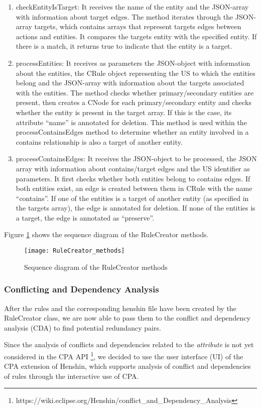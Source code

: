 \begin{enumerate}
	\item checkEntityIsTarget: It receives the name of the entity and the JSON-array with information about target edges. The method iterates through the JSON-array targets, which contains arrays that represent targets edges between actions and entities. It compares the targets entity with the specified entity. If there is a match, it returns true to indicate that the entity is a target.
	\item processEntities: It receives as parameters the JSON-object with information about the entities, the CRule object representing the US to which the entities belong and the JSON-array with information about the targets associated with the entities. The method checks whether primary/secondary entities are present, then creates a CNode for each primary/secondary entity and checks whether the entity is present in the target array. If this is the case, its attribute \enquote{name} is annotated for deletion. This method is used within the processContainsEdges method to determine whether an entity involved in a contains relationship is also a target of another entity.
	\item processContainsEdges: It receives the JSON-object to be processed, the JSON array with information about contains/target edges and the US identifier as parameters. It first checks whether both entities belong to contains edges. If both entities exist, an edge is created between them in CRule with the name \enquote{contains}. If one of the entities is a target of another entity (as specified in the targets array), the edge is annotated for deletion. If none of the entities is a target, the edge is annotated as \enquote{preserve}.
\end{enumerate}
Figure \ref{fig:rule_creator_methods} shows the sequence diagram of the RuleCreator methods.
\begin{figure}[h]
	\centering
	\texttt{[image: RuleCreator\_methods]}
	\caption{Sequence diagram of the RuleCreator methods}\label{fig:rule_creator_methods}
\end{figure}
\subsubsection*{Conflicting and Dependency Analysis}
After the rules and the corresponding henshin file have been created by the RuleCreator class, we are now able to pass them to the conflict and dependency analysis (CDA) to find potential redundancy pairs.

Since the analysis of conflicts and dependencies related to the \textit{attribute} is not yet considered in the CPA API \footnote{https://wiki.eclipse.org/Henshin/conflict\_and\_Dependency\_Analysis}, we decided to use the user interface (UI) of the CPA extension of Henshin, which supports analysis of conflict and dependencies of rules through the interactive use of CPA.

